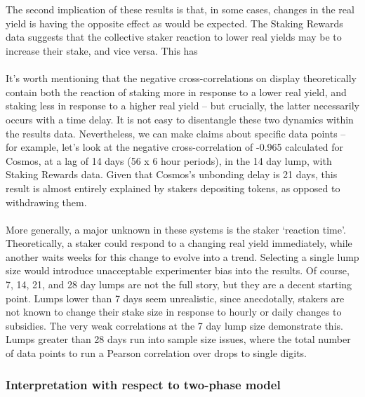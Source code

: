 \documentclass[longbibliography,nofootinbib]{revtex4-1}
\begin{document}
\\\\
The second implication of these results is that, in some cases, changes in the real yield is having the opposite effect as would be expected. The Staking Rewards data suggests that the collective staker reaction to lower real yields may be to increase their stake, and vice versa. This has 
\\\\
It's worth mentioning that the negative cross-correlations on display theoretically contain both the reaction of staking more in response to a lower real yield, and staking less in response to a higher real yield – but crucially, the latter necessarily occurs with a time delay. It is not easy to disentangle these two dynamics within the results data. Nevertheless, we can make claims about specific data points – for example, let's look at the negative cross-correlation of -0.965 calculated for Cosmos, at a lag of 14 days (56 x 6 hour periods), in the 14 day lump, with Staking Rewards data. Given that Cosmos's unbonding delay is 21 days, this result is almost entirely explained by stakers depositing tokens, as opposed to withdrawing them. 
\\\\
More generally, a major unknown in these systems is the staker `reaction time'. Theoretically, a staker could respond to a changing real yield immediately, while another waits weeks for this change to evolve into a trend. Selecting a single lump size would introduce unacceptable experimenter bias into the results. Of course, 7, 14, 21, and 28 day lumps are not the full story, but they are a decent starting point. Lumps lower than 7 days seem unrealistic, since anecdotally, stakers are not known to change their stake size in response to hourly or daily changes to subsidies. The very weak correlations at the 7 day lump size demonstrate this. Lumps greater than 28 days run into sample size issues, where the total number of data points to run a Pearson correlation over drops to single digits.

\subsubsection{Interpretation with respect to two-phase model}
\end{document}
